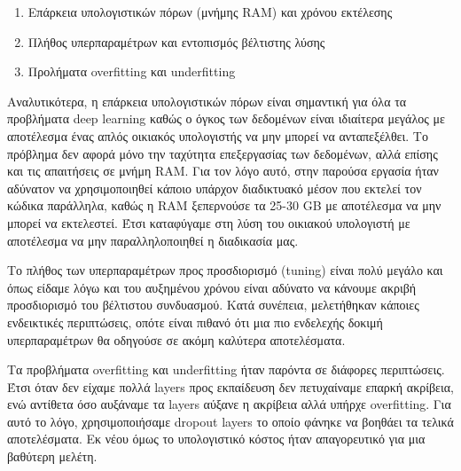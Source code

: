 \begin{enumerate}
\item Επάρκεια υπολογιστικών πόρων (μνήμης RAM) και χρόνου εκτέλεσης
\item Πλήθος υπερπαραμέτρων και εντοπισμός βέλτιστης λύσης 
\item Προλήματα overfitting και underfitting
\end{enumerate}


Αναλυτικότερα, η επάρκεια υπολογιστικών πόρων είναι σημαντική για όλα τα προβλήματα deep learning καθώς ο όγκος των δεδομένων είναι ιδιαίτερα μεγάλος με αποτέλεσμα ένας απλός οικιακός υπολογιστής να μην μπορεί να ανταπεξέλθει. Το πρόβλημα δεν αφορά μόνο την ταχύτητα επεξεργασίας των δεδομένων, αλλά επίσης και τις απαιτήσεις σε μνήμη RAM. Για τον λόγο αυτό, στην παρούσα εργασία ήταν αδύνατον να χρησιμοποιηθεί κάποιο υπάρχον διαδικτυακό μέσον που εκτελεί τον κώδικα παράλληλα, καθώς η RAM ξεπερνούσε τα 25-30 GB με αποτέλεσμα να μην μπορεί να εκτελεστεί. Έτσι καταφύγαμε στη λύση του οικιακού υπολογιστή με αποτέλεσμα να μην παραλληλοποιηθεί η διαδικασία μας.

Το πλήθος των υπερπαραμέτρων προς προσδιορισμό (tuning) είναι πολύ μεγάλο και όπως είδαμε λόγω και του αυξημένου χρόνου είναι αδύνατο να κάνουμε ακριβή προσδιορισμό του βέλτιστου συνδυασμού. Κατά συνέπεια, μελετήθηκαν κάποιες  ενδεικτικές περιπτώσεις, οπότε είναι πιθανό ότι μια πιο ενδελεχής δοκιμή υπερπαραμέτρων θα οδηγούσε σε ακόμη καλύτερα αποτελέσματα.

Τα προβλήματα overfitting και underfitting ήταν παρόντα σε διάφορες περιπτώσεις. Έτσι όταν δεν είχαμε πολλά layers προς εκπαίδευση δεν πετυχαίναμε επαρκή ακρίβεια, ενώ αντίθετα όσο αυξάναμε τα layers αύξανε η ακρίβεια αλλά υπήρχε overfitting. Για αυτό το λόγο, χρησιμοποιήσαμε dropout layers το οποίο φάνηκε να βοηθάει τα τελικά αποτελέσματα. Εκ νέου όμως το υπολογιστικό κόστος ήταν απαγορευτικό για μια βαθύτερη μελέτη.
